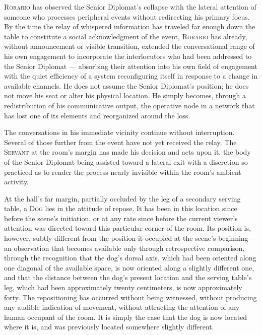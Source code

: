 \documentclass[12pt, oneside]{article}
\newenvironment{action}{%
  \vspace{0.6em}%
  \noindent\ignorespaces%
}{%
  \par\vspace{0.6em}%
}
\begin{document}
\begin{action}
\textsc{Rorario} has observed the Senior Diplomat's collapse with the lateral attention of someone who processes peripheral events without redirecting his primary focus. By the time the relay of whispered information has traveled far enough down the table to constitute a social acknowledgment of the event, \textsc{Rorario} has already, without announcement or visible transition, extended the conversational range of his own engagement to incorporate the interlocutors who had been addressed to the Senior Diplomat --- absorbing their attention into his own field of engagement with the quiet efficiency of a system reconfiguring itself in response to a change in available channels. He does not assume the Senior Diplomat's position; he does not move his seat or alter his physical location. He simply becomes, through a redistribution of his communicative output, the operative node in a network that has lost one of its elements and reorganized around the loss.

The conversations in his immediate vicinity continue without interruption. Several of those further from the event have not yet received the relay. The \textsc{Servant} at the room's margin has made his decision and acts upon it, the body of the Senior Diplomat being assisted toward a lateral exit with a discretion so practiced as to render the process nearly invisible within the room's ambient activity.

At the hall's far margin, partially occluded by the leg of a secondary serving table, a \textsc{Dog} lies in the attitude of repose. It has been in this location since before the scene's initiation, or at any rate since before the current viewer's attention was directed toward this particular corner of the room. Its position is, however, subtly different from the position it occupied at the scene's beginning --- an observation that becomes available only through retrospective comparison, through the recognition that the dog's dorsal axis, which had been oriented along one diagonal of the available space, is now oriented along a slightly different one, and that the distance between the dog's present location and the serving table's leg, which had been approximately twenty centimeters, is now approximately forty. The repositioning has occurred without being witnessed, without producing any audible indication of movement, without attracting the attention of any human occupant of the room. It is simply the case that the dog is now located where it is, and was previously located somewhere slightly different.


\end{action}
\end{document}
